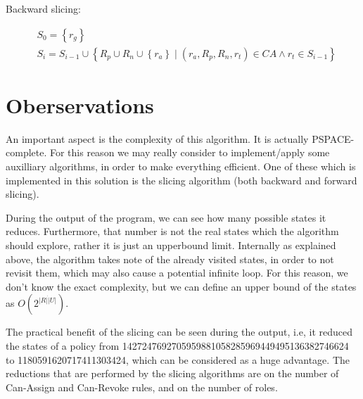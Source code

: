 \documentclass[12pt]{article}
\begin{document}
Backward slicing:

$$
\begin{aligned}
&S_{0}=\left\{r_{g}\right\} \\
&S_{i}=S_{i-1} \cup\left\{R_{p} \cup R_{n} \cup\left\{r_{a}\right\} \mid\left(r_{a}, R_{p}, R_{n}, r_{t}\right) \in C A \wedge r_{t} \in S_{i-1}\right\}
\end{aligned}
$$

\part*{Oberservations}

An important aspect is the complexity of this algorithm. It is actually PSPACE-complete. For this reason we may really consider
to implement/apply some auxilliary algorithms, in order to make everything efficient.
One of these which is implemented in this solution is the slicing algorithm (both backward and forward slicing).

During the output of the program, we can see how many possible states it reduces.
Furthermore, that number is not the real states which the algorithm should explore, rather it is just an upperbound limit.
Internally as explained above, the algorithm takes note of the already visited states, in order to not revisit them,
which may also cause a potential infinite loop.
For this reason, we don't know the exact complexity, but we can define an upper bound of the states as $O(2^{|R|\dot |U|})$.

The practical benefit of the slicing can be seen during the output, {\it} i.e, it reduced the states of a policy from
1427247692705959881058285969449495136382746624 to 1180591620717411303424, which can be considered as a huge advantage.
The reductions that are performed by the slicing algorithms are on the number of Can-Assign and Can-Revoke rules, and
on the number of roles.
\end{document}

